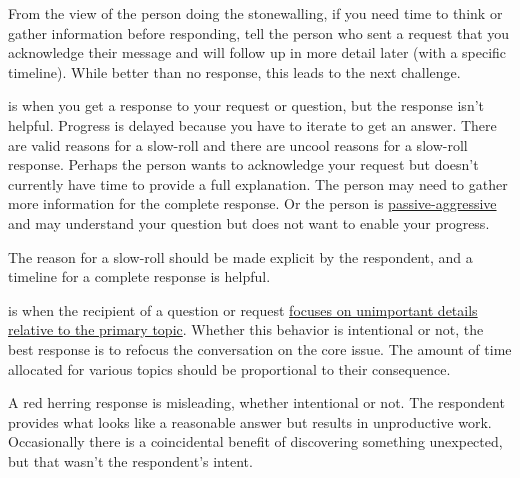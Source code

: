 From the view of the person doing the stonewalling, if you need time to think or gather information before responding, 
%
%
tell the person who sent a request that you acknowledge their message and will follow up in more detail later (with a specific timeline). While better than no response, this leads to the next challenge.

\iftoggle{glossaryinmargin}{\marginpar{[Glossary]}}{}
\iftoggle{glossarysubstitutionworks}{\Gls{slow-rolling}}{Slow-rolling} 
is when you get a response to your request or question, but the response isn't helpful. Progress is delayed because you have to iterate to get an answer. There are valid reasons for a slow-roll and there are uncool reasons for a slow-roll response. Perhaps the person wants to acknowledge your request but doesn't currently have time to provide a full explanation. The person may need to gather more information for the complete response. Or the person is \href{https://en.wikipedia.org/wiki/Passive-aggressive_behavior}{passive-aggressive}
\iftoggle{WPinmargin}{\marginpar{$>$Wikipedia: Passive-aggressive behavior}}{}%
and may understand your question but does not want to enable your progress. 

The reason for a slow-roll should be made explicit by the respondent, 
%
%
and a timeline for a complete response is helpful. 


\label{concept:bikeshedding}
\iftoggle{glossaryinmargin}{\marginpar{[Glossary]}}{}
\iftoggle{glossarysubstitutionworks}{\Gls{bikeshedding}}{Bikeshedding} 
is when the recipient of a question or request 
\href{https://en.wikipedia.org/wiki/Law_of_triviality}{focuses on unimportant details relative to the primary topic}. 
\iftoggle{WPinmargin}{\marginpar{$>$Wikipedia: Law of Triviality]}}{}%
Whether this behavior is intentional or not, the best response is to refocus the conversation on the core issue. The amount of time allocated for various topics should be proportional to their consequence. 

A \gls{red herring}\iftoggle{glossaryinmargin}{\marginpar{[Glossary]}}{}
response is misleading, whether intentional or not. The respondent provides what looks like a reasonable answer but results in unproductive work. Occasionally there is a coincidental benefit of discovering something unexpected, but that wasn't the respondent's intent. 


